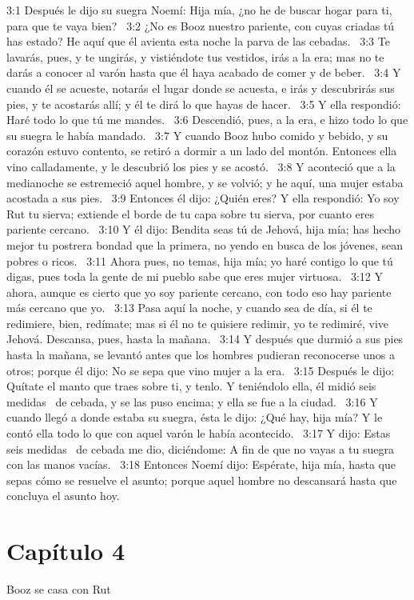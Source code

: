 3:1 Después le dijo su suegra Noemí: Hija mía, ¿no he de buscar hogar para ti, para que te vaya bien?  
3:2 ¿No es Booz nuestro pariente, con cuyas criadas tú has estado? He aquí que él avienta esta noche la parva de las cebadas.  
3:3 Te lavarás, pues, y te ungirás, y vistiéndote tus vestidos, irás a la era; mas no te darás a conocer al varón hasta que él haya acabado de comer y de beber.  
3:4 Y cuando él se acueste, notarás el lugar donde se acuesta, e irás y descubrirás sus pies, y te acostarás allí; y él te dirá lo que hayas de hacer.  
3:5 Y ella respondió: Haré todo lo que tú me mandes.  
3:6 Descendió, pues, a la era, e hizo todo lo que su suegra le había mandado.  
3:7 Y cuando Booz hubo comido y bebido, y su corazón estuvo contento, se retiró a dormir a un lado del montón. Entonces ella vino calladamente, y le descubrió los pies y se acostó.  
3:8 Y aconteció que a la medianoche se estremeció aquel hombre, y se volvió; y he aquí, una mujer estaba acostada a sus pies.  
3:9 Entonces él dijo: ¿Quién eres? Y ella respondió: Yo soy Rut tu sierva; extiende el borde de tu capa sobre tu sierva, por cuanto eres pariente cercano.  
3:10 Y él dijo: Bendita seas tú de Jehová, hija mía; has hecho mejor tu postrera bondad que la primera, no yendo en busca de los jóvenes, sean pobres o ricos.  
3:11 Ahora pues, no temas, hija mía; yo haré contigo lo que tú digas, pues toda la gente de mi pueblo sabe que eres mujer virtuosa.  
3:12 Y ahora, aunque es cierto que yo soy pariente cercano, con todo eso hay pariente más cercano que yo.  
3:13 Pasa aquí la noche, y cuando sea de día, si él te redimiere, bien, redímate; mas si él no te quisiere redimir, yo te redimiré, vive Jehová. Descansa, pues, hasta la mañana.  
3:14 Y después que durmió a sus pies hasta la mañana, se levantó antes que los hombres pudieran reconocerse unos a otros; porque él dijo: No se sepa que vino mujer a la era.  
3:15 Después le dijo: Quítate el manto que traes sobre ti, y tenlo. Y teniéndolo ella, él midió seis medidas  de cebada, y se las puso encima; y ella se fue a la ciudad.  
3:16 Y cuando llegó a donde estaba su suegra, ésta le dijo: ¿Qué hay, hija mía? Y le contó ella todo lo que con aquel varón le había acontecido.  
3:17 Y dijo: Estas seis medidas  de cebada me dio, diciéndome: A fin de que no vayas a tu suegra con las manos vacías.  
3:18 Entonces Noemí dijo: Espérate, hija mía, hasta que sepas cómo se resuelve el asunto; porque aquel hombre no descansará hasta que concluya el asunto hoy.  
\section*{Capítulo 4}
Booz se casa con Rut  

